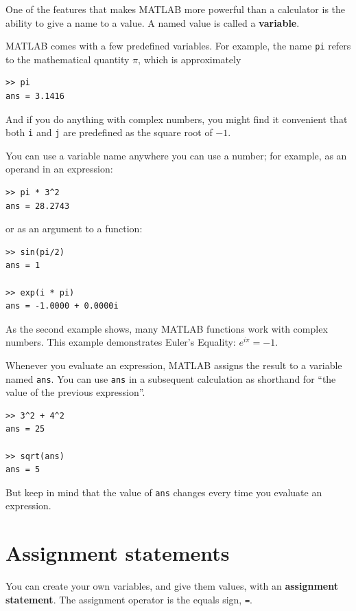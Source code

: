 \documentclass[
]{book}
\begin{document}
One of the features that makes MATLAB more powerful than a calculator
is the ability to give a name to a value.  A named value is called
a {\bf variable}.

MATLAB comes with a few predefined variables.  For
example, the name {\tt pi} refers to the
mathematical quantity $\pi$, which is approximately

\begin{verbatim}
>> pi
ans = 3.1416
\end{verbatim}

And if you do anything with complex numbers, you might find it
convenient that both {\tt i} and {\tt j} are predefined as the square
root of $-1$.

You can use a variable name anywhere you can use a number; for example, as
an operand in an expression:

\begin{verbatim}
>> pi * 3^2
ans = 28.2743
\end{verbatim}

or as an argument to a function:

\begin{verbatim}
>> sin(pi/2)
ans = 1

>> exp(i * pi)
ans = -1.0000 + 0.0000i
\end{verbatim}

As the second example shows, many MATLAB functions work with
complex numbers.  This example demonstrates Euler's Equality:
$e^{i \pi} = -1$.

Whenever you evaluate an expression, MATLAB assigns the result to
a variable named {\tt ans}.  You can use {\tt ans} in a subsequent
calculation as shorthand for ``the value of the previous expression''.

\begin{verbatim}
>> 3^2 + 4^2
ans = 25

>> sqrt(ans)
ans = 5
\end{verbatim}

But keep in mind that the value of {\tt ans} changes every time
you evaluate an expression.


\section{Assignment statements}

You can create your own variables, and give them values, with
an {\bf assignment statement}.  The assignment operator is the
equals sign, {\tt =}.
\end{document}
